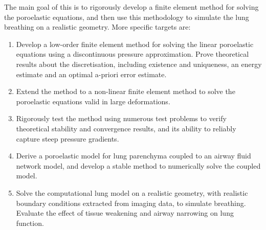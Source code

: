 The main goal of this is to  rigorously develop a finite element method for solving the poroelastic equations, and then use this methodology to simulate the lung breathing on a realistic geometry. More specific targets are:
\begin{enumerate}%
 \item Develop a low-order finite element method for solving the linear poroelastic equations using a discontinuous pressure approximation. Prove theoretical results about the discretisation, including existence and uniqueness, an energy estimate and an optimal a-priori error estimate.
\item Extend the method to a non-linear finite element method to solve the poroelastic equations valid in large deformations.
 \item Rigorously test the method using numerous test problems to verify theoretical stability and convergence results, and its ability to reliably capture steep pressure gradients. 
 \item Derive a poroelastic model for lung parenchyma coupled to an airway fluid network model, and develop a stable method to numerically solve the coupled model.
  \item Solve the computational lung model on a realistic geometry, with realistic boundary conditions extracted from imaging data, to simulate breathing. Evaluate the effect of tissue weakening and airway narrowing on lung function.
\end{enumerate}



%
%
%
%
%
